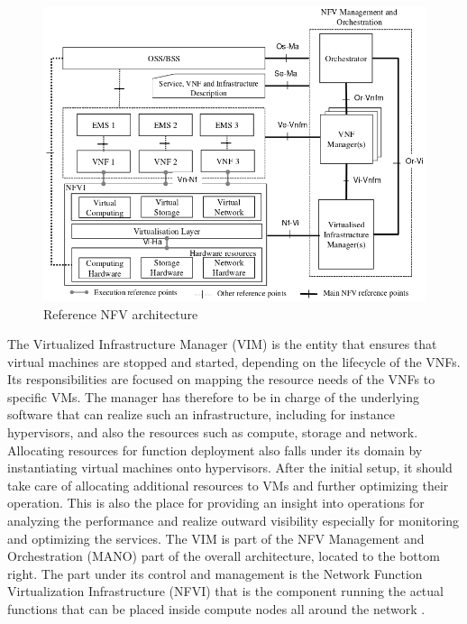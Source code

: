 \begin{figure}[H]
	\centering
	\includegraphics[width=1\linewidth]{images/nfv_ref_arch.png}
	\caption{Reference NFV architecture \cite{etsi1etsi}}
	\label{img:nfv_ref_arch}
\end{figure}

The Virtualized Infrastructure Manager (VIM) is the entity that ensures that virtual machines are stopped and started, depending on the lifecycle of the VNFs.
Its responsibilities are focused on mapping the resource needs of the VNFs to specific VMs. The manager has therefore to be in charge of the underlying software that can realize such an infrastructure, including for instance hypervisors, and also the resources such as compute, storage and network. Allocating resources for function deployment also falls under its domain by instantiating virtual machines onto hypervisors. After the initial setup, it should take care of allocating additional resources to VMs and further optimizing their operation. This is also the place for providing an insight into operations for analyzing the performance and realize outward visibility especially for monitoring and optimizing the services. 
The VIM is part of the NFV Management and Orchestration (MANO) part of the overall architecture, located to the bottom right. The part under its control and management is the Network Function Virtualization Infrastructure (NFVI) that is the component running the actual functions that can be placed inside compute nodes all around the network \cite{nfv_etsi}. 

